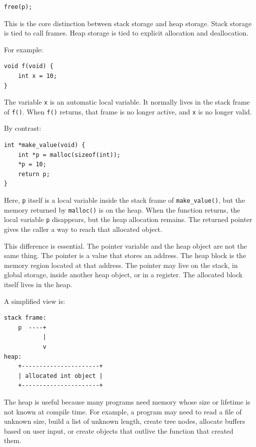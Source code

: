 \begin{verbatim}
free(p);
\end{verbatim}

This is the core distinction between stack storage and heap storage. Stack storage is tied to call frames. Heap storage is tied to explicit allocation and deallocation.

For example:

\begin{verbatim}
void f(void) {
    int x = 10;
}
\end{verbatim}

The variable \texttt{x} is an automatic local variable. It normally lives in the stack frame of \texttt{f()}. When \texttt{f()} returns, that frame is no longer active, and \texttt{x} is no longer valid.

By contrast:

\begin{verbatim}
int *make_value(void) {
    int *p = malloc(sizeof(int));
    *p = 10;
    return p;
}
\end{verbatim}

Here, \texttt{p} itself is a local variable inside the stack frame of \texttt{make\_value()}, but the memory returned by \texttt{malloc()} is on the heap. When the function returns, the local variable \texttt{p} disappears, but the heap allocation remains. The returned pointer gives the caller a way to reach that allocated object.

This difference is essential. The pointer variable and the heap object are not the same thing. The pointer is a value that stores an address. The heap block is the memory region located at that address. The pointer may live on the stack, in global storage, inside another heap object, or in a register. The allocated block itself lives in the heap.

A simplified view is:

\begin{verbatim}
stack frame:
    p  ----+
           |
           v
heap:
    +----------------------+
    | allocated int object |
    +----------------------+
\end{verbatim}

The heap is useful because many programs need memory whose size or lifetime is not known at compile time. For example, a program may need to read a file of unknown size, build a list of unknown length, create tree nodes, allocate buffers based on user input, or create objects that outlive the function that created them.


